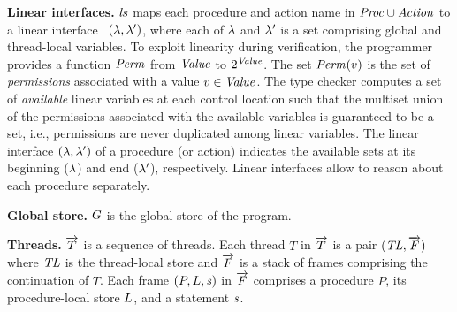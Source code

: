 \noindent
{\bf Linear interfaces.}
$\mathit{ls}$ maps each procedure and action name in $\mathit{Proc} \cup \mathit{Action}$ to a linear interface~\cite{Wadler90lineartypes}
$(\lambda,\lambda')$, where each of $\lambda$ and $\lambda'$ is a set comprising global and thread-local variables.
To exploit linearity during verification, the programmer provides a function $\mathit{Perm}$ from $\mathit{Value}$ to $2^{\mathit{Value}}$.
The set $\mathit{Perm}(v)$ is the set of {\em permissions\/} associated with a value $v \in \mathit{Value}$.
The \civl type checker computes a set of {\em available\/} linear variables at each control location such that
the multiset union of the permissions associated with the available variables is guaranteed to be a set, i.e., 
permissions are never duplicated among linear variables.
The linear interface $(\lambda, \lambda')$ of a procedure (or action) indicates the available sets
at its beginning ($\lambda$) and end ($\lambda'$), respectively.
Linear interfaces allow \civl to reason about each procedure separately.

\noindent
{\bf Global store.}
$G$ is the global store of the program.

\noindent
{\bf Threads.}
$\overrightarrow{T}$ is a sequence of threads.
Each thread $T$ in $\overrightarrow{T}$ is a pair $(\mathit{TL}, \overrightarrow{F})$ where
$\mathit{TL}$ is the thread-local store and $\overrightarrow{F}$ is a stack of frames comprising the continuation of $T$.  
Each frame $(P, L, \mathit{s})$ in $\overrightarrow{F}$ comprises a procedure $P$, its procedure-local store $L$, 
and a statement $\mathit{s}$.

